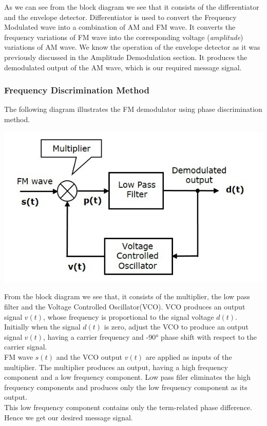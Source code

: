 \documentclass[12pt,a4paper]{article}%
\begin{document}
\begin{flushleft}
\begin{flushleft}
\begin{flushleft}
\begin{flushleft}
\begin{flushleft}
\begin{center}
						\end{center}
						As we can see from the block diagram we see that it consists of the differentiator and the envelope detector. Differentiator is used to convert the Frequency Modulated wave into a combination of AM and FM wave. It converts the frequency variations of FM wave into the corresponding voltage (\textit{amplitude}) variations of AM wave. We know the operation of the envelope detector as it was previously discussed in the Amplitude Demodulation section. It produces the demodulated output of the AM wave, which is our required message signal.
					\end{flushleft}
					\subsubsection{Frequency Discrimination Method}
					\begin{flushleft}
						The following diagram illustrates the FM demodulator using phase discrimination method.
						\begin{center}
							\includegraphics[width=0.60 \textwidth]{./images/Phase discrimination method.png}
						\end{center}
						From the block diagram we see that, it consists of the multiplier, the low pass filter and the Voltage Controlled Oscillator(VCO). VCO produces an output signal $v(t)$, whose frequency is proportional to the signal voltage $d(t)$. \\\smallskip
						Initially when the signal $d(t)$ is zero, adjust the VCO to produce an output signal $v(t)$, having a carrier frequency and -\ang{90} phase shift with respect to the carrier signal.\\\smallskip
						FM wave $s(t)$ and the VCO output $v(t)$ are applied as inputs of the multiplier. The multiplier produces an output, having a high frequency component and a low frequency component. Low pass filer eliminates the high frequency components and produces only the low frequency component as its output.\\\smallskip
						This low frequency component contains only the term-related phase difference. Hence we get our desired message signal.
					\end{flushleft}
				\end{flushleft}
			\end{flushleft} 
		\end{flushleft}
	\end{flushleft}
	\pagebreak
 	
\end{document}
